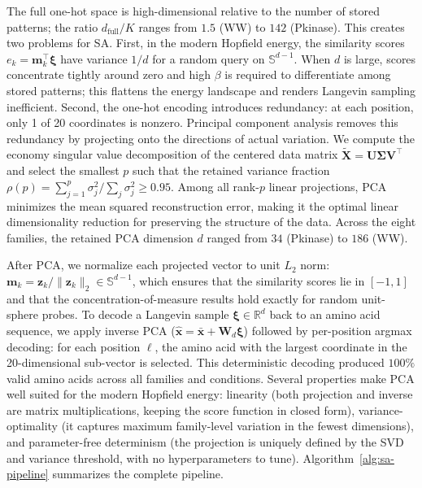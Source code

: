 \documentclass[10pt]{article}
\begin{document}
The full one-hot space is high-dimensional relative to the number of stored patterns; the ratio $d_{\mathrm{full}}/K$ ranges from $1.5$ (WW) to $142$ (Pkinase). This creates two problems for SA. First, in the modern Hopfield energy, the similarity scores $e_k = \mathbf{m}_k^\top\boldsymbol{\xi}$ have variance $1/d$ for a random query on $\mathbb{S}^{d-1}$. When $d$ is large, scores concentrate tightly around zero and high $\beta$ is required to differentiate among stored patterns; this flattens the energy landscape and renders Langevin sampling inefficient. Second, the one-hot encoding introduces redundancy: at each position, only 1 of 20 coordinates is nonzero. Principal component analysis removes this redundancy by projecting onto the directions of actual variation. We compute the economy singular value decomposition of the centered data matrix $\tilde{\mathbf{X}} = \mathbf{U}\boldsymbol{\Sigma}\mathbf{V}^\top$ and select the smallest $p$ such that the retained variance fraction $\rho(p) = \sum_{j=1}^p \sigma_j^2 / \sum_j \sigma_j^2 \geq 0.95$. Among all rank-$p$ linear projections, PCA minimizes the mean squared reconstruction error, making it the optimal linear dimensionality reduction for preserving the structure of the data. Across the eight families, the retained PCA dimension $d$ ranged from $34$ (Pkinase) to $186$ (WW).

After PCA, we normalize each projected vector to unit $L_2$ norm: $\mathbf{m}_k = \mathbf{z}_k / \|\mathbf{z}_k\|_2 \in \mathbb{S}^{d-1}$, which ensures that the similarity scores lie in $[-1, 1]$ and that the concentration-of-measure results hold exactly for random unit-sphere probes. To decode a Langevin sample $\boldsymbol{\xi} \in \mathbb{R}^d$ back to an amino acid sequence, we apply inverse PCA ($\hat{\mathbf{x}} = \bar{\mathbf{x}} + \mathbf{W}_d\boldsymbol{\xi}$) followed by per-position argmax decoding: for each position $\ell$, the amino acid with the largest coordinate in the 20-dimensional sub-vector is selected. This deterministic decoding produced $100\%$ valid amino acids across all families and conditions. Several properties make PCA well suited for the modern Hopfield energy: linearity (both projection and inverse are matrix multiplications, keeping the score function in closed form), variance-optimality (it captures maximum family-level variation in the fewest dimensions), and parameter-free determinism (the projection is uniquely defined by the SVD and variance threshold, with no hyperparameters to tune). Algorithm~\ref{alg:sa-pipeline} summarizes the complete pipeline.
\end{document}
